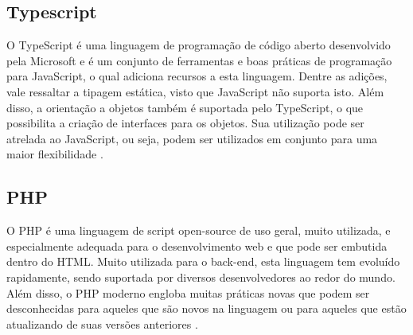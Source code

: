 \subsection{Typescript}
O TypeScript é uma linguagem de programação de código aberto desenvolvido pela Microsoft e é um conjunto de ferramentas e boas práticas de programação para JavaScript, o qual adiciona recursos a esta linguagem. Dentre as adições, vale ressaltar a tipagem estática, visto que JavaScript não suporta isto\cite{TYPESCRIPT}. Além disso, a orientação a objetos também é suportada pelo TypeScript, o que possibilita a criação de interfaces para os objetos. Sua utilização pode ser atrelada ao JavaScript, ou seja, podem ser utilizados em conjunto para uma maior flexibilidade \cite{CHERNY}.
\subsection{PHP}
O PHP é uma linguagem de script open-source de uso geral, muito utilizada, e especialmente adequada para o desenvolvimento web e que pode ser embutida dentro do HTML. Muito utilizada para o back-end, esta linguagem tem evoluído rapidamente, sendo suportada por diversos desenvolvedores ao redor do mundo. Além disso, o PHP moderno engloba muitas práticas novas que podem ser desconhecidas para aqueles que são novos na linguagem ou para aqueles que estão atualizando de suas versões anteriores \cite{LOCKHART}.
